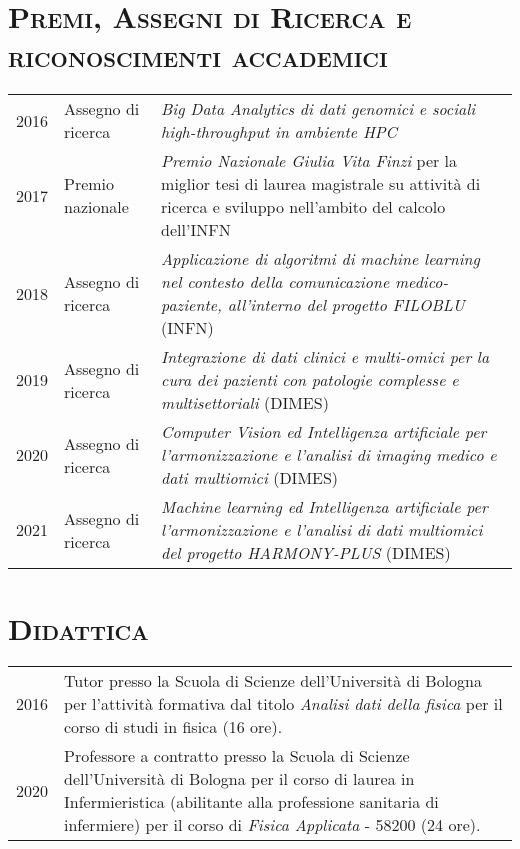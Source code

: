 \documentclass[a4paper,11pt]{article}
\begin{document}
\section*{\scshape{Premi, Assegni di Ricerca e riconoscimenti accademici}}

\begin{tabular}{llp{12cm}}

  2016 & Assegno di ricerca & \emph{Big Data Analytics di dati genomici e sociali high-throughput in ambiente HPC} \\
  2017 & Premio nazionale   & \emph{Premio Nazionale Giulia Vita Finzi} per la miglior tesi di laurea magistrale su attività di ricerca e sviluppo nell'ambito del calcolo dell'INFN\\
  2018 & Assegno di ricerca & \emph{Applicazione di algoritmi di machine learning nel contesto della comunicazione medico-paziente, all'interno del progetto FILOBLU} (INFN)\\
  2019 & Assegno di ricerca & \emph{Integrazione di dati clinici e multi-omici per la cura dei pazienti con patologie complesse e multisettoriali} (DIMES)\\
  2020 & Assegno di ricerca & \emph{Computer Vision ed Intelligenza artificiale per l'armonizzazione e l'analisi di imaging medico e dati multiomici} (DIMES)\\
  2021 & Assegno di ricerca & \emph{Machine learning ed Intelligenza artificiale per l'armonizzazione e l'analisi di dati multiomici del progetto HARMONY-PLUS} (DIMES)\\

\end{tabular}


\vspace*{0.5cm}
\section*{\scshape{Didattica}}

\begin{tabular}{lp{14cm}}

  2016 & Tutor presso la Scuola di Scienze dell'Università di Bologna per l'attività formativa dal titolo \emph{Analisi dati della fisica} per il corso di studi in fisica (16 ore). \\
  2020\textemdash2022 & Professore a contratto presso la Scuola di Scienze dell'Università di Bologna per il corso di laurea in Infermieristica (abilitante alla professione sanitaria di infermiere) per il corso di \emph{Fisica Applicata} - 58200 (24 ore). \\

\end{tabular}
\end{document}
